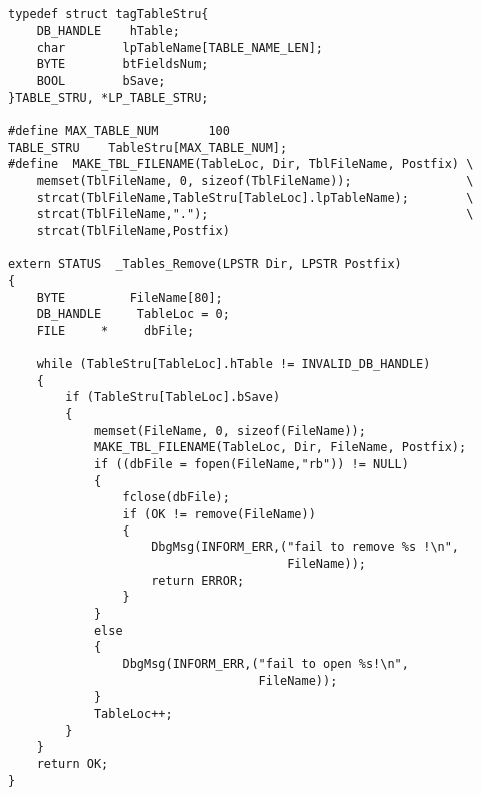 ﻿\documentclass  [11pt,onecolumn]{article}
\begin{document}
\subsection{}
\begin{lstlisting}
typedef struct tagTableStru{
    DB_HANDLE    hTable;
    char        lpTableName[TABLE_NAME_LEN];
    BYTE        btFieldsNum;
    BOOL        bSave;
}TABLE_STRU, *LP_TABLE_STRU;

#define MAX_TABLE_NUM       100
TABLE_STRU    TableStru[MAX_TABLE_NUM];
#define  MAKE_TBL_FILENAME(TableLoc, Dir, TblFileName, Postfix) \
    memset(TblFileName, 0, sizeof(TblFileName));                \
    strcat(TblFileName,TableStru[TableLoc].lpTableName);        \
    strcat(TblFileName,".");                                    \
    strcat(TblFileName,Postfix)

extern STATUS  _Tables_Remove(LPSTR Dir, LPSTR Postfix)
{
    BYTE         FileName[80];
    DB_HANDLE     TableLoc = 0;
    FILE     *     dbFile;

    while (TableStru[TableLoc].hTable != INVALID_DB_HANDLE)
    {
        if (TableStru[TableLoc].bSave)
        {
            memset(FileName, 0, sizeof(FileName));
            MAKE_TBL_FILENAME(TableLoc, Dir, FileName, Postfix);
            if ((dbFile = fopen(FileName,"rb")) != NULL)
            {
                fclose(dbFile);
                if (OK != remove(FileName))
                {
                    DbgMsg(INFORM_ERR,("fail to remove %s !\n",
                                       FileName));
                    return ERROR;
                }
            }
            else
            {
                DbgMsg(INFORM_ERR,("fail to open %s!\n",
                                   FileName));
            }
            TableLoc++;
        }
    }
    return OK;
}
\end{lstlisting}
\end{document}
